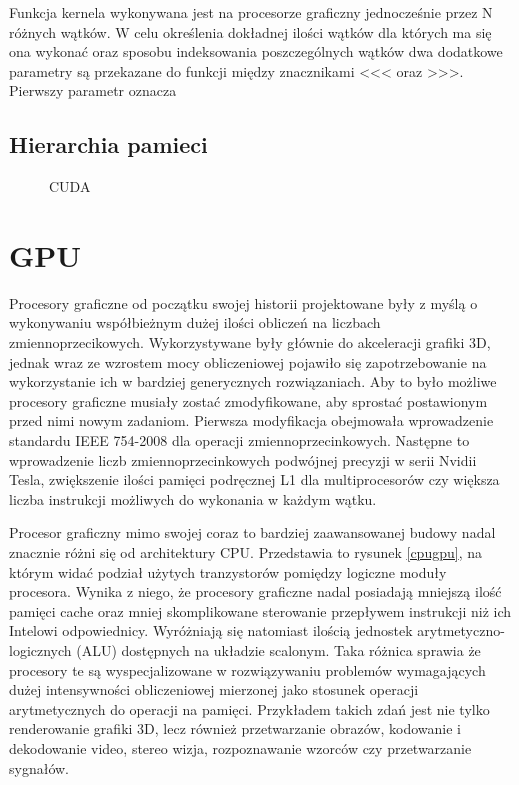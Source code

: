 Funkcja kernela wykonywana jest na procesorze graficzny jednocześnie przez N
różnych wątków. W celu określenia dokładnej ilości wątków dla których ma się ona
wykonać oraz sposobu indeksowania poszczególnych wątków dwa dodatkowe parametry
są przekazane do funkcji między znacznikami <<< oraz >>>. Pierwszy parametr
oznacza 

\subsection{Hierarchia pamieci}



\begin{figure}[ht]
\centering

\caption{CUDA}
\label{cuda-model}
\end{figure}

\section{GPU}

Procesory graficzne od początku swojej historii projektowane były z myślą o
wykonywaniu współbieżnym dużej ilości obliczeń na liczbach zmiennoprzecikowych. 
Wykorzystywane były głównie do akceleracji grafiki 3D, jednak wraz ze wzrostem mocy obliczeniowej
pojawiło się zapotrzebowanie na wykorzystanie ich w bardziej
generycznych rozwiązaniach. Aby to było możliwe procesory graficzne musiały
zostać zmodyfikowane, aby sprostać postawionym przed nimi nowym zadaniom.
Pierwsza modyfikacja obejmowała wprowadzenie standardu IEEE 754-2008 dla
operacji zmiennoprzecinkowych. Następne to wprowadzenie liczb
zmiennoprzecinkowych podwójnej precyzji w serii Nvidii Tesla, zwiększenie ilości
pamięci podręcznej L1 dla multiprocesorów czy większa liczba instrukcji
możliwych do wykonania w każdym wątku.

Procesor graficzny mimo swojej coraz to bardziej zaawansowanej budowy nadal
znacznie różni się od architektury CPU. Przedstawia to rysunek \ref{cpugpu}, na
którym widać podział użytych tranzystorów pomiędzy logiczne moduły procesora.
Wynika z niego, że procesory graficzne nadal posiadają mniejszą ilość pamięci cache oraz
mniej skomplikowane sterowanie przepływem instrukcji niż ich Intelowi
odpowiednicy. Wyróżniają się natomiast ilością jednostek arytmetyczno-logicznych
(ALU) dostępnych na układzie scalonym. Taka różnica sprawia że procesory te są wyspecjalizowane w rozwiązywaniu
problemów wymagających dużej intensywności obliczeniowej mierzonej jako stosunek
operacji arytmetycznych do operacji na pamięci. Przykładem takich zdań jest nie tylko 
renderowanie grafiki 3D, lecz również przetwarzanie obrazów, kodowanie i
dekodowanie video, stereo wizja, rozpoznawanie wzorców czy przetwarzanie sygnałów.

